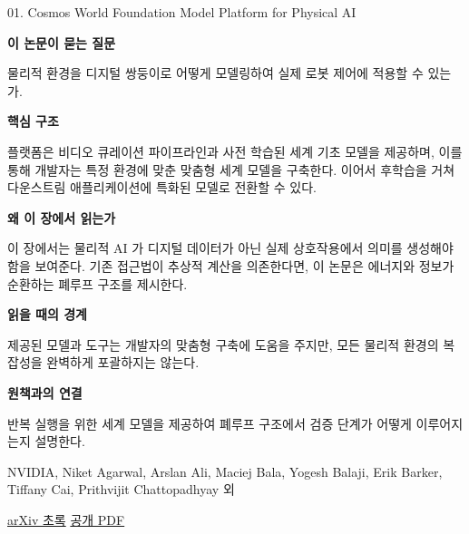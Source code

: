 \documentclass[11pt,openany]{book}
\begin{document}
\begin{termcard}{01. Cosmos World Foundation Model Platform for Physical AI}

\par

\medskip

{\sffamily\bfseries\color{deepblue} 이 논문이 묻는 질문}\par

물리적 환경을 디지털 쌍둥이로 어떻게 모델링하여 실제 로봇 제어에 적용할 수 있는가.

\smallskip

{\sffamily\bfseries\color{deepblue} 핵심 구조}\par

플랫폼은 비디오 큐레이션 파이프라인과 사전 학습된 세계 기초 모델을 제공하며, 이를 통해 개발자는 특정 환경에 맞춘 맞춤형 세계 모델을 구축한다. 이어서 후학습을 거쳐 다운스트림 애플리케이션에 특화된 모델로 전환할 수 있다.

\smallskip

{\sffamily\bfseries\color{deepblue} 왜 이 장에서 읽는가}\par

이 장에서는 물리적 AI 가 디지털 데이터가 아닌 실제 상호작용에서 의미를 생성해야 함을 보여준다. 기존 접근법이 추상적 계산을 의존한다면, 이 논문은 에너지와 정보가 순환하는 폐루프 구조를 제시한다.

\smallskip

{\sffamily\bfseries\color{coral} 읽을 때의 경계}\par

제공된 모델과 도구는 개발자의 맞춤형 구축에 도움을 주지만, 모든 물리적 환경의 복잡성을 완벽하게 포괄하지는 않는다.

\smallskip

{\sffamily\bfseries\color{teal} 원책과의 연결}\par

반복 실행을 위한 세계 모델을 제공하여 폐루프 구조에서 검증 단계가 어떻게 이루어지는지 설명한다.

\medskip

{\footnotesize\color{muted} NVIDIA, Niket Agarwal, Arslan Ali, Maciej Bala, Yogesh Balaji, Erik Barker, Tiffany Cai, Prithvijit Chattopadhyay 외\par

\href{https://arxiv.org/abs/2501.03575}{arXiv 초록} \quad \href{https://arxiv.org/pdf/2501.03575}{공개 PDF}\par}

\end{termcard}
\end{document}
